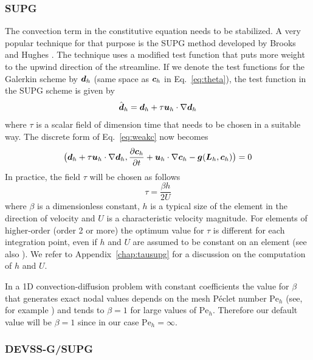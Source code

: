 \subsubsection{SUPG}

The convection term in the constitutive equation needs to be stabilized. A very
popular technique for that purpose is the SUPG method developed by
Brooks and Hughes \cite{Brooks82}. The technique uses a modified test function
that puts more weight to the upwind direction of the streamline. If we denote
the test functions for the Galerkin scheme by $\boldsymbol{d}_h$ (same space as $\boldsymbol{c}_h$ in Eq.~\eqref{eq:theta}), the test function in the SUPG scheme is given by
\[
     \hat{\boldsymbol{d}}_h = \boldsymbol{d}_h+\tau\boldsymbol{u}_h\cdot\nabla \boldsymbol{d}_h
\]
where $\tau$ is a scalar field of dimension time that needs to be chosen in
a suitable way. The discrete form of Eq.~\eqref{eq:weakc} now becomes
\begin{equation}
 \big(\boldsymbol{d}_h+\tau\boldsymbol{u}_h\cdot\nabla \boldsymbol{d}_h,\dfrac{\partial \boldsymbol{c}_h}{\partial t}
+\boldsymbol{u}_h\cdot\nabla\boldsymbol{c}_h-\boldsymbol{g}(\boldsymbol{L}_h,\boldsymbol{c}_h)\big)= 0
\label{eq:weakcd}
\end{equation}
In practice, the field $\tau$ will be chosen as follows 
\begin{equation}
       \tau = \frac{\beta h}{2 U}
    \label{eq:taufactor}
\end{equation}
where $\beta$ is a dimensionless constant,
$h$ is a typical size of the element in the direction of velocity and $U$ is a
characteristic velocity magnitude.
For elements of higher-order (order 2 or
more) the optimum value for $\tau$ is different for each integration point,
even if $h$ and $U$ are assumed to be constant on an element
(see also \cite{Donea03}). 
We refer to Appendix~\ref{chap:tausupg} for a discussion on the
computation of $h$ and $U$.

In a 1D convection-diffusion problem with constant
coefficients the value for $\beta$ that generates exact nodal values depends on
the mesh P\'eclet number $\text{Pe}_h$ (see, for example \cite{Donea03}) and
tends to $\beta=1$ for large values of $\text{Pe}_h$. Therefore our default
value will be $\beta=1$ since in our case $\text{Pe}_h=\infty$.

\subsubsection{DEVSS-G/SUPG}


